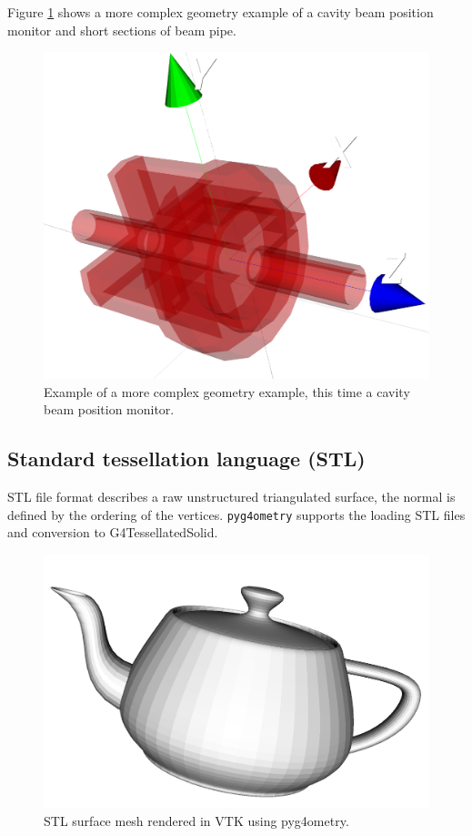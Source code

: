 \documentclass[a4paper,
               keeplastbox,   %
               ]{jacow}
\begin{document}
Figure \ref{fig:dipole} shows a more complex geometry example of a cavity beam position monitor and short sections of beam pipe.
\begin{figure}[!htb]
   \centering
   \includegraphics*[width=.8\columnwidth]{./examples/dipole.jpg}
   \caption{Example of a more complex geometry example, this time a cavity beam position monitor.}
   \label{fig:dipole}
\end{figure}

\subsection{Standard tessellation language (STL)}
STL file format describes a raw unstructured triangulated surface, the normal is defined by the ordering of the vertices. \verb|pyg4ometry| supports the loading 
STL files and conversion to G4TessellatedSolid. 

\begin{figure}[!htb]
   \centering
   \includegraphics*[width=.6\columnwidth]{./examples/utahteapot.jpg}
   \caption{STL surface mesh rendered in VTK using pyg4ometry.}
   \label{fig:simple}
\end{figure}
\end{document}
